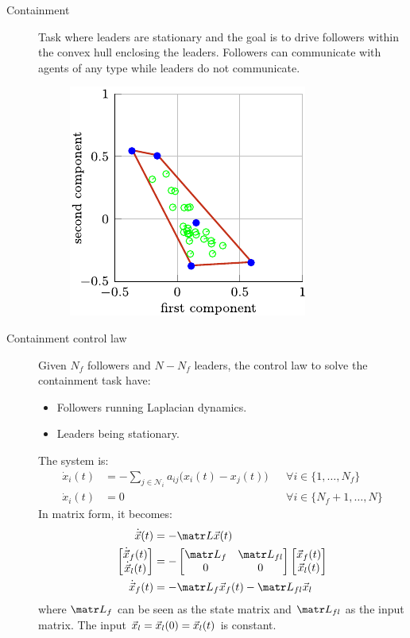 \begin{description}
    \item[Containment] 
        Task where leaders are stationary and the goal is to drive followers within the convex hull enclosing the leaders. Followers can communicate with agents of any type while leaders do not communicate.

        \begin{figure}[H]
            \centering
            \includegraphics[width=0.3\linewidth]{./img/_containment.pdf}
        \end{figure}

    \item[Containment control law] 
        Given $N_f$ followers and $N-N_f$ leaders, the control law to solve the containment task have:
        \begin{itemize}
            \item Followers running Laplacian dynamics.
            \item Leaders being stationary.
        \end{itemize}

        The system is:
        \[
            \begin{aligned}
                \dot{x}_i(t) &= - \sum_{j \in \mathcal{N}_i} a_{ij} \big( x_i(t) - x_j(t) \big) & & \forall i \in \{ 1, \dots, N_f \} \\
                \dot{x}_i(t) &= 0 & & \forall i \in \{ N_f + 1, \dots, N \}
            \end{aligned}
        \]
        In matrix form, it becomes:
        \[
            \begin{split}
                \dot{\x}(t) &= - \lap \x(t) \\
                \begin{bmatrix} \dot{\x}_f(t) \\ \dot{\x}_l(t) \end{bmatrix} &=
                - \begin{bmatrix} \lap_f & \lap_{fl} \\ 0 & 0 \end{bmatrix}
                \begin{bmatrix} \x_f(t) \\ \x_l(t) \end{bmatrix} \\
                \dot{\x}_f(t) &= - \lap_f \x_f(t) - \lap_{fl} \x_l
            \end{split}
        \]
        where $\lap_f$ can be seen as the state matrix and
        $\lap_{fl}$ as the input matrix. The input ${\vec{x}}_l = {\vec{x}}_l(0) = {\vec{x}}_l(t)$ is constant.
\end{description}

